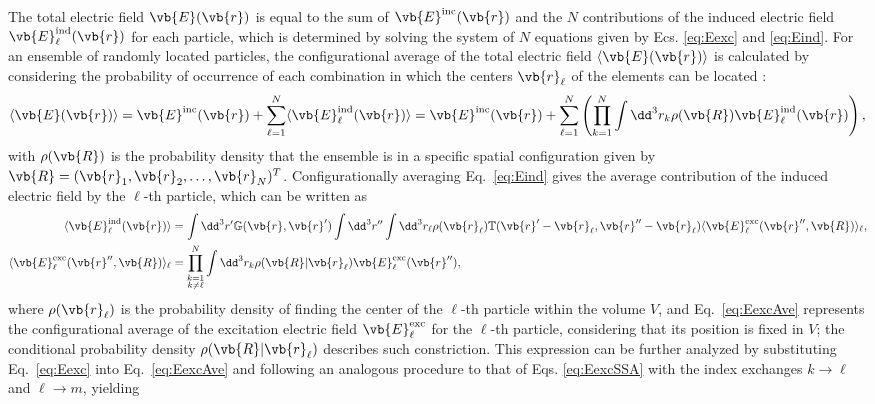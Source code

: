 The total electric field $\vb{E}(\vb{r})$ is equal to the sum of $\vb{E}^\text{inc}(\vb{r})$ and the $N$ contributions of the induced electric field $\vb{E}^\text{ind}_\ell(\vb{r})$ for each particle, which is determined by solving the system of $N$ equations given by Ecs. \eqref{eq:Eexc} and \eqref{eq:Eind}. For an ensemble of randomly located particles, the configurational average of the total electric field $\langle\vb{E}(\vb{r})\rangle$ is calculated by considering the probability of occurrence of each combination in which the centers $\vb{r}_\ell$ of the elements can be located \cite{garcia2012multiple,barrera_coherent_2003}:
%
\begin{align}
	\langle\vb{E}(\vb{r})\rangle =
	\vb{E}^\text{inc}(\vb{r}) + \sum_{\ell = 1}^N \langle  \vb{E}^\text{ind}_\ell  (\vb{r})\rangle
	= \vb{E}^\text{inc}(\vb{r}) +  \sum_{\ell = 1}^N  \left(\prod_{k = 1}^N \int\dd^3 r_k \rho(\vb{R}) \vb{E}^\text{ind}_\ell(\vb{r})\right),
	\label{eq:Eave}
\end{align}
%
with $\rho(\vb{R})$ is the probability density that the ensemble is in a specific spatial configuration given by $\vb{R} = (\vb{r}_1,\vb{r}_2,\ldots,\vb{r}_N)^T$. Configurationally averaging Eq.~\eqref{eq:Eind} gives the average contribution of the induced electric field by the $\ell$-th particle, which can be written as \cite{barrera_coherent_2003,garcia2012multiple}
%
\begin{subequations}%
	\begin{align}%
		\langle \vb{E}^\text{ind}_\ell(\vb{r}) \rangle &= \int\dd^3 r'\mathbb{G}(\vb{r},\vb{r}')
		\int\dd^3 r'' \int \dd^3 r_\ell \rho(\vb{r}_\ell) \mathbb{T}(\vb{r}'-\vb{r}_\ell,\vb{r}''-\vb{r}_\ell)
		\langle \vb{E}_\ell^\text{exc}(\vb{r}'',\vb{R})\rangle_\ell,%
		\\
		\langle \vb{E}_\ell^\text{exc}(\vb{r}'',\vb{R})\rangle_\ell
		&= \prod_{\substack{k =1 \\ k\neq \ell}}^N  \int\dd^3 r_k \rho(\vb{R}|\vb{r}_\ell) \vb{E}^\text{exc}_\ell(\vb{r}''),
		\label{eq:EexcAve}
	\end{align}%
	\label{eq:EexcSSA}%
\end{subequations}%
%
where $\rho(\vb{r}_\ell)$ is the probability density of finding the center of the $\ell$-th particle within the volume $V$, and Eq.~\eqref{eq:EexcAve} represents the configurational average of the excitation electric field $\vb{E}_\ell^\text{exc}$ for the $\ell$-th particle, considering that its position is fixed in $V$; the conditional probability density $\rho(\vb{R}|\vb{r}_\ell)$ describes such constriction. This expression can be further analyzed by substituting Eq.~\eqref{eq:Eexc} into Eq.~\eqref{eq:EexcAve} and following an analogous procedure to that of Eqs. \eqref{eq:EexcSSA} with the index exchanges $k\to\ell$ and $\ell \to m$, yielding
